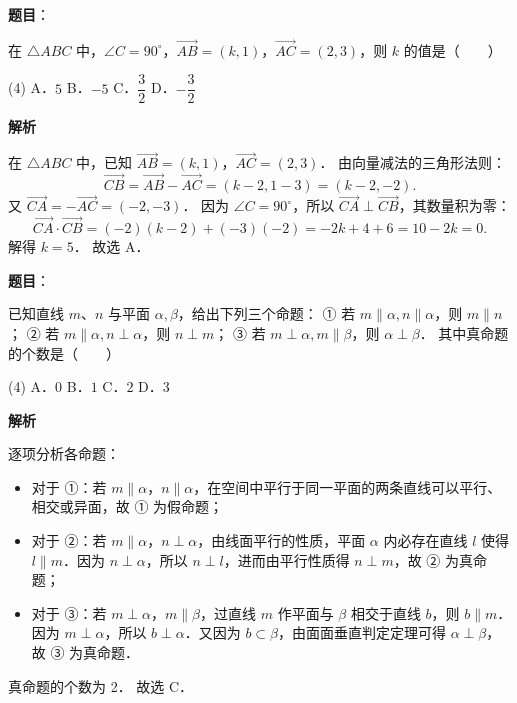 \begin{answer}

\textbf{题目}：

在 $\triangle ABC$ 中，$\angle C = 90^\circ$，$\overrightarrow{AB} = (k, 1)$，$\overrightarrow{AC} = (2, 3)$，则 $k$ 的值是\mbox{（　　）}

\begin{gkopts}(4)
\task A．$5$
\task B．$-5$
\task C．$\dfrac{3}{2}$
\task D．$-\dfrac{3}{2}$
\end{gkopts}

\textbf{解析}

在 $\triangle ABC$ 中，已知 $\overrightarrow{AB} = (k, 1)$，$\overrightarrow{AC} = (2, 3)$．
由向量减法的三角形法则：
\nopagebreak[4]
\[
\overrightarrow{CB} = \overrightarrow{AB} - \overrightarrow{AC} = (k - 2, 1 - 3) = (k - 2, -2).
\]
又 $\overrightarrow{CA} = -\overrightarrow{AC} = (-2, -3)$．
因为 $\angle C = 90^\circ$，所以 $\overrightarrow{CA} \perp \overrightarrow{CB}$，其数量积为零：
\nopagebreak[4]
\[
\overrightarrow{CA} \cdot \overrightarrow{CB} = (-2)(k - 2) + (-3)(-2) = -2k + 4 + 6 = 10 - 2k = 0.
\]
解得 $k = 5$．
故选 A．


\end{answer}
\begin{answer}

\textbf{题目}：

已知直线 $m$、$n$ 与平面 $\alpha, \beta$，给出下列三个命题：
① 若 $m \parallel \alpha, n \parallel \alpha$，则 $m \parallel n$；
② 若 $m \parallel \alpha, n \perp \alpha$，则 $n \perp m$；
③ 若 $m \perp \alpha, m \parallel \beta$，则 $\alpha \perp \beta$．
其中真命题的个数是\mbox{（　　）}

\begin{gkopts}(4)
\task A．$0$
\task B．$1$
\task C．$2$
\task D．$3$
\end{gkopts}

\textbf{解析}

逐项分析各命题：
\begin{itemize}
\item 对于 ①：若 $m \parallel \alpha$，$n \parallel \alpha$，在空间中平行于同一平面的两条直线可以平行、相交或异面，故 ① 为假命题；
\item 对于 ②：若 $m \parallel \alpha$，$n \perp \alpha$，由线面平行的性质，平面 $\alpha$ 内必存在直线 $l$ 使得 $l \parallel m$．因为 $n \perp \alpha$，所以 $n \perp l$，进而由平行性质得 $n \perp m$，故 ② 为真命题；
\item 对于 ③：若 $m \perp \alpha$，$m \parallel \beta$，过直线 $m$ 作平面与 $\beta$ 相交于直线 $b$，则 $b \parallel m$．因为 $m \perp \alpha$，所以 $b \perp \alpha$．又因为 $b \subset \beta$，由面面垂直判定定理可得 $\alpha \perp \beta$，故 ③ 为真命题．
\end{itemize}

真命题的个数为 2．
故选 C．


\end{answer}

